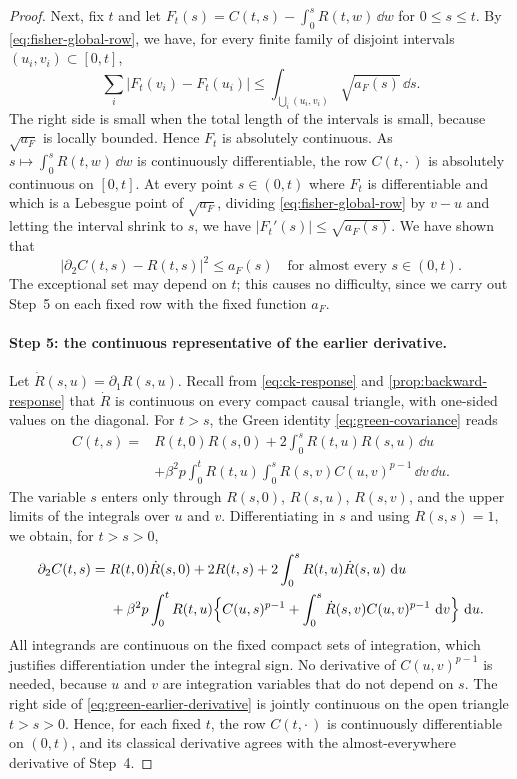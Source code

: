 \begin{proof}
Next, fix $t$ and let $F_t(s)=C(t,s)-\int_0^sR(t,w)\,\dd w$ for $0\le s\le t$. By \eqref{eq:fisher-global-row}, we have, for every finite family of disjoint intervals $(u_i,v_i)\subset[0,t]$,
\[
 \sum_i|F_t(v_i)-F_t(u_i)|\le\int_{\bigcup_i(u_i,v_i)}\sqrt{a_F(s)}\,\dd s.
\]
The right side is small when the total length of the intervals is small, because $\sqrt{a_F}$ is locally bounded. Hence $F_t$ is absolutely continuous. As $s\mapsto\int_0^sR(t,w)\,\dd w$ is continuously differentiable, the row $C(t,\cdot\,)$ is absolutely continuous on $[0,t]$. At every point $s\in(0,t)$ where $F_t$ is differentiable and which is a Lebesgue point of $\sqrt{a_F}$, dividing \eqref{eq:fisher-global-row} by $v-u$ and letting the interval shrink to $s$, we have $|F_t'(s)|\le\sqrt{a_F(s)}$. We have shown that
\[
 |\partial_2C(t,s)-R(t,s)|^2\le a_F(s)\quad\text{for almost every }s\in(0,t).
\]
The exceptional set may depend on $t$; this causes no difficulty, since we carry out Step~5 on each fixed row with the fixed function $a_F$.

\paragraph{Step 5: the continuous representative of the earlier derivative.}
Let $\dot R(s,u)=\partial_1R(s,u)$. Recall from \eqref{eq:ck-response} and \cref{prop:backward-response} that $\dot R$ is continuous on every compact causal triangle, with one-sided values on the diagonal. For $t>s$, the Green identity \eqref{eq:green-covariance} reads
\[
\begin{aligned}
 C(t,s)={}&R(t,0)R(s,0)+2\int_0^sR(t,u)R(s,u)\,\dd u\\
 &+\beta^2p\int_0^tR(t,u)\int_0^sR(s,v)C(u,v)^{p-1}\,\dd v\,\dd u.
\end{aligned}
\]
The variable $s$ enters only through $R(s,0)$, $R(s,u)$, $R(s,v)$, and the upper limits of the integrals over $u$ and $v$. Differentiating in $s$ and using $R(s,s)=1$, we obtain, for $t>s>0$,
\begin{align}
 \partial_2C(t,s)={}&R(t,0)\dot R(s,0)+2R(t,s)
 +2\int_0^sR(t,u)\dot R(s,u)\,\mathop{}\!\mathrm d u\notag\\
 &+\beta^2p\int_0^tR(t,u)
 \Bigl\{C(u,s)^{p-1}+\int_0^s\dot R(s,v)C(u,v)^{p-1}\,\mathop{}\!\mathrm d v\Bigr\}\,\mathop{}\!\mathrm d u.
 \label{eq:green-earlier-derivative}
\end{align}
All integrands are continuous on the fixed compact sets of integration, which justifies differentiation under the integral sign. No derivative of $C(u,v)^{p-1}$ is needed, because $u$ and $v$ are integration variables that do not depend on $s$. The right side of \eqref{eq:green-earlier-derivative} is jointly continuous on the open triangle $t>s>0$. Hence, for each fixed $t$, the row $C(t,\cdot\,)$ is continuously differentiable on $(0,t)$, and its classical derivative agrees with the almost-everywhere derivative of Step~4.


\end{proof}
